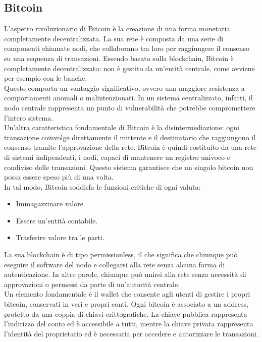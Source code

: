 \subsection{Bitcoin}

L’aspetto rivoluzionario di Bitcoin è la creazione di una forma monetaria completamente decentralizzata. La sua rete è composta da una serie di componenti chiamate nodi, che collaborano tra loro per raggiungere il consenso su una sequenza di transazioni.
Essendo basato sulla blockchain, Bitcoin è completamente decentralizzato: non è gestito da un’entità centrale, come avviene per esempio con le banche. 
\\Questo comporta un vantaggio significativo, ovvero una maggiore resistenza a comportamenti anomali o malintenzionati. In un sistema centralizzato, infatti, il nodo centrale rappresenta un punto di vulnerabilità che potrebbe compromettere l’intero sistema.
\\Un’altra caratteristica fondamentale di Bitcoin è la disintermediazione: ogni transazione coinvolge direttamente il mittente e il destinatario che raggiungono il consenso tramite l’approvazione della rete. Bitcoin è quindi costituito da una rete di sistemi indipendenti, i nodi, capaci di mantenere un registro univoco e condiviso delle transazioni. Questo sistema garantisce che un singolo bitcoin non possa essere speso più di una volta.\\
In tal modo, Bitcoin soddisfa le funzioni critiche di ogni valuta:
\begin{itemize}
\item Immagazzinare valore.
\item Essere un’entità contabile.
\item Trasferire valore tra le parti.
\end{itemize}
La sua blockchain è di tipo permissionless, il che significa che chiunque può eseguire il software del nodo e collegarsi alla rete senza alcuna forma di autenticazione. In altre parole, chiunque può unirsi alla rete senza necessità di approvazioni o permessi da parte di un’autorità centrale.
\\Un elemento fondamentale è il wallet che consente agli utenti di gestire i propri bitcoin, conservati in veri e propri conti. Ogni bitcoin è associato a un address, protetto da una coppia di chiavi crittografiche.
La chiave pubblica rappresenta l’indirizzo del conto ed è accessibile a tutti, mentre la chiave privata rappresenta l’identità del proprietario ed è necessaria per accedere e autorizzare le transazioni.
